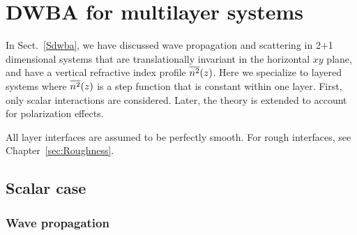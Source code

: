 

\chapter{DWBA for multilayer systems}  \label{sec:Multilayers}


%

In Sect.~\ref{Sdwba},
we have discussed wave propagation and scattering in 2$+$1 dimensional systems
that are translationally invariant in the horizontal $xy$ plane,
and have a vertical refractive index profile $\overline{n^2}(z)$.
Here we specialize to layered systems
where $\overline{n^2}(z)$ is a step function that is constant within one layer.
First, only scalar interactions are considered.
Later, the theory is extended to account for polarization effects.


All layer interfaces are assumed to be perfectly smooth.
For rough interfaces, see Chapter~\ref{sec:Roughness}.

\section{Scalar case}


\subsection{Wave propagation}

%

